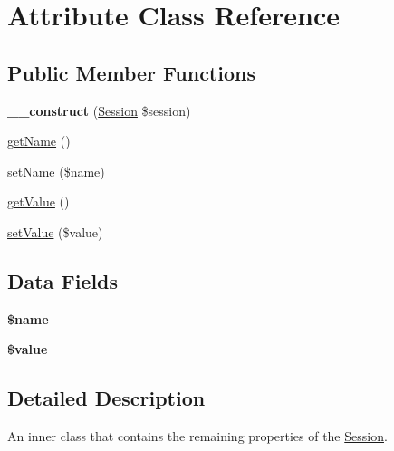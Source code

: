 \hypertarget{class_attribute}{\section{Attribute Class Reference}
\label{class_attribute}
}
\subsection*{Public Member Functions}
\begin{DoxyCompactItemize}
\item 
\hypertarget{class_attribute_a8d7e295eddad26a4d908095b24dde3d3}{{\bfseries \+\_\+\+\_\+construct} (\hyperlink{class_session}{Session} \$session)}\label{class_attribute_a8d7e295eddad26a4d908095b24dde3d3}

\item 
\hyperlink{class_attribute_a3d0963e68bb313b163a73f2803c64600}{get\+Name} ()
\item 
\hyperlink{class_attribute_a2fe666694997d047711d7653eca2f132}{set\+Name} (\$name)
\item 
\hyperlink{class_attribute_ac0bc18784b182c89fcfd276625aef435}{get\+Value} ()
\item 
\hyperlink{class_attribute_a7494441b6ed08a391704971873f31432}{set\+Value} (\$value)
\end{DoxyCompactItemize}
\subsection*{Data Fields}
\begin{DoxyCompactItemize}
\item 
\hypertarget{class_attribute_ab2fc40d43824ea3e1ce5d86dee0d763b}{{\bfseries \$name}}\label{class_attribute_ab2fc40d43824ea3e1ce5d86dee0d763b}

\item 
\hypertarget{class_attribute_a0f298096f322952a72a50f98a74c7b60}{{\bfseries \$value}}\label{class_attribute_a0f298096f322952a72a50f98a74c7b60}

\end{DoxyCompactItemize}


\subsection{Detailed Description}
An inner class that contains the remaining properties of the \hyperlink{class_session}{Session}. 

